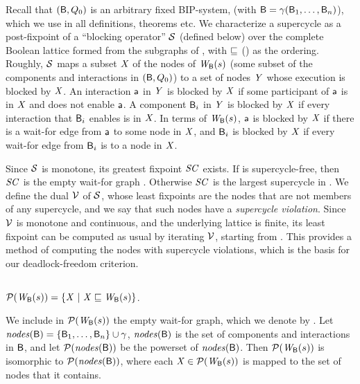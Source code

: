 Recall that $(\mathsf{B}, Q_0)$ is an arbitrary fixed BIP-system, (with $\mathsf{B} = \gamma(\mathsf{B}_1,\dots,\mathsf{B}_n)$),
which we use in all definitions, theorems etc.
%
We characterize a supercycle as a post-fixpoint of a ``blocking operator'' $\mathcal{S}$ (defined below) over the complete Boolean lattice formed from the
subgraphs of , with $\sqsubseteq$ () as the ordering.
%
Roughly, $\mathcal{S}$ maps a subset $\mathit{X}$ of the nodes of $\mathit{W}_{\mathsf{B}}({s})$ (\ie some subset of the components and interactions in $(\mathsf{B}, Q_0)$)
to a set of nodes $\mathit{Y}$ whose execution is blocked by $\mathit{X}$. An interaction $\mathsf{a}$ in $\mathit{Y}$ is blocked by $\mathit{X}$ if some participant of $\mathsf{a}$ is in $\mathit{X}$ and does
not enable $\mathsf{a}$. A component $\mathsf{B}_i$  in $\mathit{Y}$ is blocked by $\mathit{X}$ if every interaction that $\mathsf{B}_i$ enables is in $\mathit{X}$. In terms of $\mathit{W}_{\mathsf{B}}({s})$,
$\mathsf{a}$ is blocked by $\mathit{X}$ if there is a wait-for edge from $\mathsf{a}$ to some node in $\mathit{X}$, and $\mathsf{B}_i$ is blocked by $\mathit{X}$ if every wait-for edge from $\mathsf{B}_i$ is to a
node in $\mathit{X}$. 

Since $\mathcal{S}$ is monotone, its greatest fixpoint $\mathit{SC}$ exists.  If  is supercycle-free, then $\mathit{SC}$ is the empty wait-for graph \ewfg.
Otherwise $\mathit{SC}$ is the largest supercycle in .  We define the dual $\mathcal{V}$ of $\mathcal{S}$, whose least fixpoints are the nodes that are not
members of any supercycle, and we say that such nodes have a \emph{supercycle violation}. Since 
$\mathcal{V}$ is monotone and continuous, and the underlying lattice is finite, its least fixpoint can be computed as usual by iterating $\mathcal{V}$, starting from \ewfg.
This provides a method of computing the nodes with supercycle violations, which is the basis for our deadlock-freedom criterion.



\subsection{}
\label{secn:supercycle-fixpoint}

\begin{definition} \label{defn:wsetOfSubgraphs}
$\mathcal{P}(\mathit{W}_{\mathsf{B}}({s})) = \{  \mathit{X} ~|~ \mathit{X} \sqsubseteq \mathit{W}_{\mathsf{B}}({s})  \}$.
\end{definition}
We include in $\mathcal{P}(\mathit{W}_{\mathsf{B}}({s}))$ the empty wait-for graph, which we denote by \ewfg.
Let $\mathit{nodes}(\mathsf{B}) = \{ \mathsf{B}_1,\ldots,\mathsf{B}_n \} \cup \gamma$, \ie  $\mathit{nodes}(\mathsf{B})$ is the set of components and interactions in $\mathsf{B}$, and
let $\mathcal{P}(\mathit{nodes}(\mathsf{B}))$ be the powerset of $\mathit{nodes}(\mathsf{B})$.
Then $\mathcal{P}(\mathit{W}_{\mathsf{B}}({s}))$ is isomorphic to $\mathcal{P}(\mathit{nodes}(\mathsf{B}))$, where each $\mathit{X} \in \mathcal{P}(\mathit{W}_{\mathsf{B}}({s}))$ is mapped to the set of nodes that it contains.

